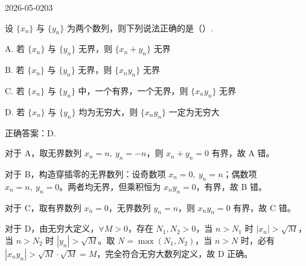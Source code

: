 \begin{mistake}{2026-05-02}{03}

\begin{problemcontent}
设 \(\{x_n\}\) 与 \(\{y_n\}\) 为两个数列，则下列说法正确的是（\quad）.

A. 若 \(\{x_n\}\) 与 \(\{y_n\}\) 无界，则 \(\{x_n + y_n\}\) 无界

B. 若 \(\{x_n\}\) 与 \(\{y_n\}\) 无界，则 \(\{x_n y_n\}\) 无界

C. 若 \(\{x_n\}\) 与 \(\{y_n\}\) 中，一个有界，一个无界，则 \(\{x_n y_n\}\) 无界

D. 若 \(\{x_n\}\) 与 \(\{y_n\}\) 均为无穷大，则 \(\{x_n y_n\}\) 一定为无穷大
\end{problemcontent}

\begin{solutioncontent}
正确答案：D.

对于 A，取无界数列 \(x_n=n,\ y_n=-n\)，则 \(x_n+y_n=0\) 有界，故 A 错。

对于 B，构造穿插零的无界数列：设奇数项 \(x_n=0,\ y_n=n\)；偶数项 \(x_n=n,\ y_n=0\)。两者均无界，但乘积恒为 \(x_n y_n=0\)，有界，故 B 错。

对于 C，取有界数列 \(x_n=0\)，无界数列 \(y_n=n\)，则 \(x_n y_n=0\) 有界，故 C 错。

对于 D，由无穷大定义，\(\forall M>0\)，存在 \(N_1, N_2>0\)，当 \(n>N_1\) 时 \(|x_n|>\sqrt{M}\)，当 \(n>N_2\) 时 \(|y_n|>\sqrt{M}\)。取 \(N=\max(N_1,N_2)\)，当 \(n>N\) 时，必有 \(|x_n y_n| > \sqrt{M}\cdot\sqrt{M}=M\)，完全符合无穷大数列定义，故 D 正确。
\end{solutioncontent}


\end{mistake}
